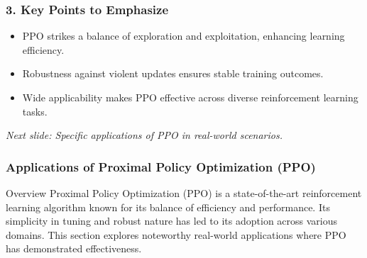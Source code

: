 \documentclass{beamer}
\begin{document}
\begin{frame}
    \frametitle{3. Key Points to Emphasize}
    \begin{itemize}
        \item PPO strikes a balance of exploration and exploitation, enhancing learning efficiency.
        \item Robustness against violent updates ensures stable training outcomes.
        \item Wide applicability makes PPO effective across diverse reinforcement learning tasks.
    \end{itemize}
    \vfill
    \textit{Next slide: Specific applications of PPO in real-world scenarios.}
\end{frame}

\begin{frame}[fragile]
    \frametitle{Applications of Proximal Policy Optimization (PPO)}
    \begin{block}{Overview}
        Proximal Policy Optimization (PPO) is a state-of-the-art reinforcement learning algorithm known for its balance of efficiency and performance. Its simplicity in tuning and robust nature has led to its adoption across various domains. This section explores noteworthy real-world applications where PPO has demonstrated effectiveness.
    \end{block}
\end{frame}
\end{document}
